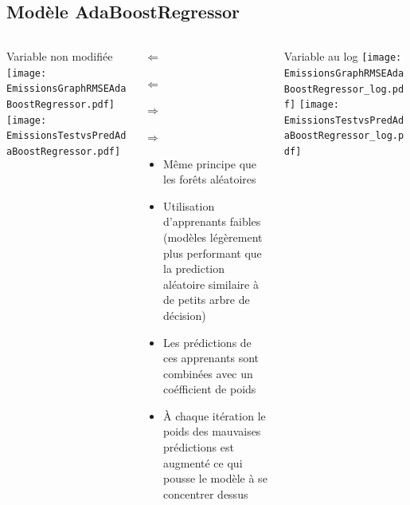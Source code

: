 \documentclass[8pt,aspectratio=169,hyperref={unicode=true}]{beamer}
\begin{document}
\subsection{Modèle AdaBoostRegressor}
\begin{frame}{\insertsubsection}
  \begin{columns}[t]
    \begin{column}{.33\textwidth}
      \centering Variable non modifiée
      \texttt{[image: EmissionsGraphRMSEAdaBoostRegressor.pdf]}
      \texttt{[image: EmissionsTestvsPredAdaBoostRegressor.pdf]}
    \end{column}
    \begin{column}{.33\textwidth}
      $\Longleftarrow$
      \scriptsize
      {\centering
        }
      

      \normalsize
      $\Longleftarrow$

      \raggedleft $\Longrightarrow$
      \scriptsize
      {\centering
        }
      

      \normalsize
      $\Longrightarrow$

      \footnotesize
      \begin{itemize}
        \item Même principe que les forêts aléatoires
        \item Utilisation d'apprenants faibles (modèles légèrement plus performant que la prediction aléatoire
                similaire à de petits arbre de décision)
        \item Les prédictions de ces apprenants sont combinées avec un coéfficient de poids 
        \item À chaque itération le poids des mauvaises prédictions est augmenté ce qui pousse le modèle 
              à se concentrer dessus
      \end{itemize}
    \end{column}
    \begin{column}{.33\textwidth}
      \centering Variable au log
      \texttt{[image: EmissionsGraphRMSEAdaBoostRegressor\_log.pdf]}
      \texttt{[image: EmissionsTestvsPredAdaBoostRegressor\_log.pdf]}
    \end{column}
  \end{columns}
\end{frame}
\end{document}
